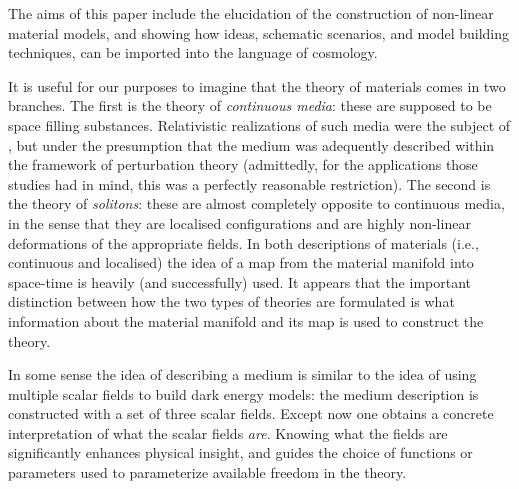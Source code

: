 The aims of this paper include the elucidation of the construction of non-linear material models, and  showing how ideas, schematic scenarios, and model building techniques, can be imported into the language of cosmology.

It is useful for our purposes to imagine that the theory of materials comes in two branches. The first is the theory of   \textit{continuous media}: these are supposed to be space filling substances. Relativistic realizations of such media were the subject of \cite{Bucher:1998mh, Battye:2007aa, Pearson:2014iaa}, but under the presumption that the medium was adequently described within the framework of perturbation theory (admittedly,  for the applications those studies had in mind, this was a perfectly reasonable restriction).  The second is the theory of \textit{solitons}: these are almost completely opposite to continuous media, in the sense that they are localised configurations and are highly non-linear deformations of the appropriate fields. In both descriptions of materials (i.e., continuous and localised) the idea of a map from the material manifold into space-time is heavily (and successfully) used. It appears that the important distinction between how the two types of theories are formulated is what information about the material manifold and its map is used to construct the theory.

In some sense the idea of describing a medium is similar to the idea of using multiple scalar fields to build dark energy models: the medium description is constructed with a set of three scalar fields. Except now one obtains a concrete interpretation of what the scalar fields \textit{are}. Knowing what the fields are significantly enhances physical insight, and guides the choice of  functions or parameters used to parameterize available freedom in the theory.



